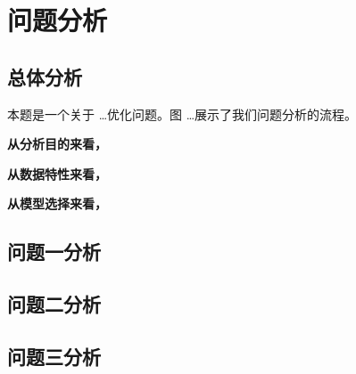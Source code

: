 \section{问题分析}

\subsection{总体分析}

本题是一个关于 \dots 优化问题。图 \dots 展示了我们问题分析的流程。

\textbf{从分析目的来看，}

\textbf{从数据特性来看，}

\textbf{从模型选择来看，}



\subsection{问题一分析}



\subsection{问题二分析}



\subsection{问题三分析}

